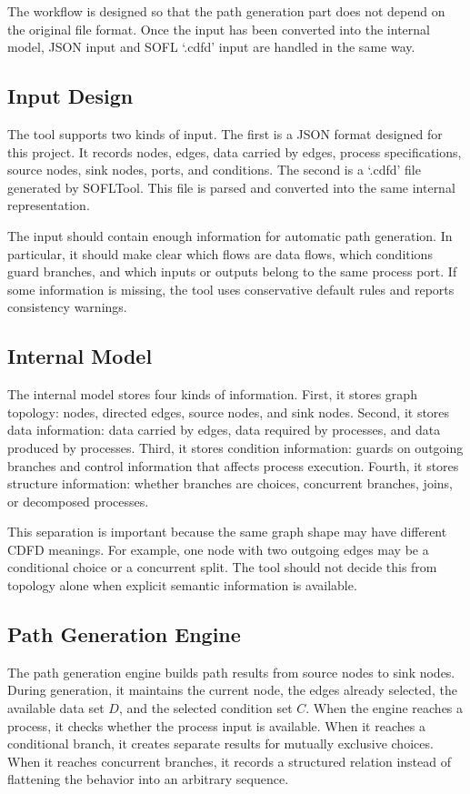 \documentclass[conference]{template/IEEEtran}
\begin{document}
The workflow is designed so that the path generation part does not depend on the original file format. Once the input has been converted into the internal model, JSON input and SOFL `.cdfd' input are handled in the same way.

\subsection{Input Design}

The tool supports two kinds of input. The first is a JSON format designed for this project. It records nodes, edges, data carried by edges, process specifications, source nodes, sink nodes, ports, and conditions. The second is a `.cdfd' file generated by SOFLTool. This file is parsed and converted into the same internal representation.

The input should contain enough information for automatic path generation. In particular, it should make clear which flows are data flows, which conditions guard branches, and which inputs or outputs belong to the same process port. If some information is missing, the tool uses conservative default rules and reports consistency warnings.

\subsection{Internal Model}

The internal model stores four kinds of information. First, it stores graph topology: nodes, directed edges, source nodes, and sink nodes. Second, it stores data information: data carried by edges, data required by processes, and data produced by processes. Third, it stores condition information: guards on outgoing branches and control information that affects process execution. Fourth, it stores structure information: whether branches are choices, concurrent branches, joins, or decomposed processes.

This separation is important because the same graph shape may have different CDFD meanings. For example, one node with two outgoing edges may be a conditional choice or a concurrent split. The tool should not decide this from topology alone when explicit semantic information is available.

\subsection{Path Generation Engine}

The path generation engine builds path results from source nodes to sink nodes. During generation, it maintains the current node, the edges already selected, the available data set \(D\), and the selected condition set \(C\). When the engine reaches a process, it checks whether the process input is available. When it reaches a conditional branch, it creates separate results for mutually exclusive choices. When it reaches concurrent branches, it records a structured relation instead of flattening the behavior into an arbitrary sequence.
\end{document}
